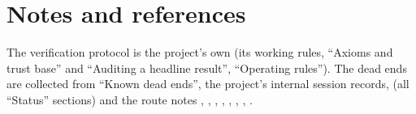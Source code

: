 \section{Notes and references}\label{ch15:sec:notes}

The verification protocol is the project's own (its working rules, 
``Axioms and trust base'' and ``Auditing a headline result'', 
``Operating rules''). The dead ends are collected from  ``Known dead ends'',
the project's internal session records,  (all ``Status'' sections) and the route notes
, , ,
, , ,
, .

